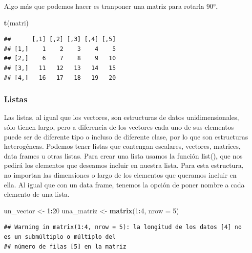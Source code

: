 \documentclass[
]{book}
\newenvironment{Shaded}{\begin{snugshade}}{\end{snugshade}}
\newcommand{\AttributeTok}[1]{\textcolor[rgb]{0.13,0.29,0.53}{#1}}
\newcommand{\DecValTok}[1]{\textcolor[rgb]{0.00,0.00,0.81}{#1}}
\newcommand{\FunctionTok}[1]{\textcolor[rgb]{0.13,0.29,0.53}{\textbf{#1}}}
\newcommand{\NormalTok}[1]{#1}
\newcommand{\OtherTok}[1]{\textcolor[rgb]{0.56,0.35,0.01}{#1}}
\newcommand{\SpecialCharTok}[1]{\textcolor[rgb]{0.81,0.36,0.00}{\textbf{#1}}}
\begin{document}
Algo más que podemos hacer es tranponer una matriz para rotarla 90°.

\begin{Shaded}
\begin{Highlighting}[]
\FunctionTok{t}\NormalTok{(matri)}
\end{Highlighting}
\end{Shaded}

\begin{verbatim}
##      [,1] [,2] [,3] [,4] [,5]
## [1,]    1    2    3    4    5
## [2,]    6    7    8    9   10
## [3,]   11   12   13   14   15
## [4,]   16   17   18   19   20
\end{verbatim}

\subsubsection{Listas}\label{listas}

Las listas, al igual que los vectores, son estructuras de datos unidimensionales, sólo tienen largo, pero a diferencia de los vectores cada uno de sus elementos puede ser de diferente tipo o incluso de diferente clase, por lo que son estructuras heterogéneas.
Podemos tener listas que contengan escalares, vectores, matrices, data frames u otras listas.
Para crear una lista usamos la función list(), que nos pedirá los elementos que deseamos incluir en nuestra lista.
Para esta estructura, no importan las dimensiones o largo de los elementos que queramos incluir en ella.
Al igual que con un data frame, tenemos la opción de poner nombre a cada elemento de una lista.

\begin{Shaded}
\begin{Highlighting}[]
\NormalTok{un\_vector }\OtherTok{\textless{}{-}} \DecValTok{1}\SpecialCharTok{:}\DecValTok{20}
\NormalTok{una\_matriz }\OtherTok{\textless{}{-}} \FunctionTok{matrix}\NormalTok{(}\DecValTok{1}\SpecialCharTok{:}\DecValTok{4}\NormalTok{, }\AttributeTok{nrow =} \DecValTok{5}\NormalTok{)}
\end{Highlighting}
\end{Shaded}

\begin{verbatim}
## Warning in matrix(1:4, nrow = 5): la longitud de los datos [4] no es un submúltiplo o múltiplo del
## número de filas [5] en la matriz
\end{verbatim}
\end{document}
